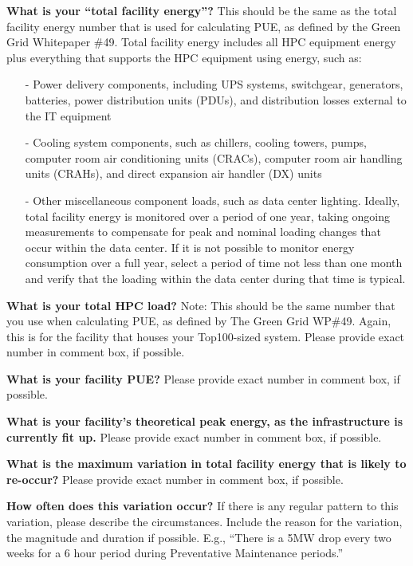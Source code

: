 \noindent
\textbf{What is your ``total facility energy''?}
This should be the same as the total facility energy number that is used for calculating PUE, 
as defined by the Green Grid Whitepaper \#49.  Total facility energy includes all 
HPC equipment energy plus everything that supports the HPC equipment using energy, such as:
\begin{itemize} %
\item[{-}]
Power delivery components, including UPS systems, switchgear, generators, batteries, power 
distribution units (PDUs), and distribution losses external to the IT equipment  
\item[{-}]
Cooling system components, such as chillers, cooling towers, pumps, computer 
room air conditioning units (CRACs), computer room air handling units (CRAHs), and direct 
expansion air handler (DX) units  
\item[{-}]
Other miscellaneous component loads, such as data center lighting.
Ideally, total facility energy is monitored over a period of one year, taking 
ongoing measurements to compensate for peak and nominal loading changes that occur within the data 
center. If it is not possible to monitor energy consumption over a full year, select a period 
of time not less than one month and verify that the loading within the data center 
during that time is typical.	
\end{itemize}

\wl
\noindent
\textbf{What is your total HPC load?}
Note:  This should be the same number that you use when calculating PUE, as defined by 
The Green Grid WP\#49.  Again, this is for the facility that houses your Top100-sized system.  	
Please provide exact number in comment box, if possible.	

\wl
\noindent
\textbf{What is your facility PUE?}
Please provide exact number in comment box, if possible.

\wl
\noindent
\textbf{What is your facility's theoretical peak energy, as the infrastructure is currently fit up.}
Please provide exact number in comment box, if possible.	

\wl
\noindent
\textbf{What is the maximum variation in total facility energy that is likely to re-occur?}
Please provide exact number in comment box, if possible.

\wl
\noindent
\textbf{How often does this variation occur?}
If there is any regular pattern to this variation, please describe the circumstances.  
Include the reason for the variation, the magnitude and duration if possible.  
E.g., ``There is a 5MW drop every two weeks for a 6 hour period during Preventative Maintenance 
periods.'' 

